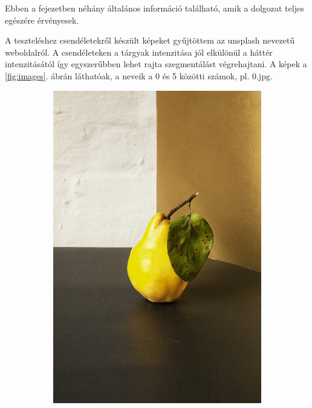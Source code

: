 
Ebben a fejezetben néhány általános információ található, amik a dolgozat teljes egészére érvényesek.


A teszteléshez csendéletekről készült képeket gyűjtöttem az unsplash nevezetű weboldalról. \cite{unsplash}
A csendéleteken a tárgyak intenzitása jól elkülönül a háttér intenzitásától így egyszerűbben lehet rajta szegmentálást végrehajtani.
A képek a \ref{fig:images}. ábrán láthatóak, a neveik a 0 és 5 közötti számok, pl. 0.jpg.

\begin{figure}[htb]
    \centering %
\begin{subfigure}{0.25\textwidth}
  \includegraphics[width=\linewidth]{../images/0.jpg}

\end{subfigure}
\end{figure}
